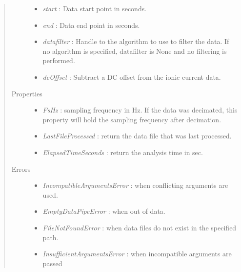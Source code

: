 \documentclass[letterpaper,10pt,english]{sphinxmanual}
\begin{document}
\begin{fulllineitems}
\begin{quote}
\begin{description}
\begin{itemize}
\item {} 
\emph{start} :             Data start point in seconds.

\item {} 
\emph{end} :                       Data end point in seconds.

\item {} 
\emph{datafilter} :        Handle to the algorithm to use to filter the data. If no algorithm is specified, datafilter     is None and no filtering is performed.

\item {} 
\emph{dcOffset} :          Subtract a DC offset from the ionic current data.

\end{itemize}

\item[{Properties}] \leavevmode\begin{itemize}
\item {} 
\emph{FsHz} :                                      sampling frequency in Hz. If the data was decimated, this property will hold the sampling frequency after decimation.

\item {} 
\emph{LastFileProcessed} :         return the data file that was last processed.

\item {} 
\emph{ElapsedTimeSeconds} :        return the analysis time in sec.

\end{itemize}

\item[{Errors}] \leavevmode\begin{itemize}
\item {} 
\emph{IncompatibleArgumentsError} :        when conflicting arguments are used.

\item {} 
\emph{EmptyDataPipeError} :                        when out of data.

\item {} 
\emph{FileNotFoundError} :                         when data files do not exist in the specified path.

\item {} 
\emph{InsufficientArgumentsError} :        when incompatible arguments are passed

\end{itemize}

\end{description}\end{quote}


\end{fulllineitems}
\end{document}
